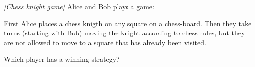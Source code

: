 

%




\noindent 

\begin{problem}
\textit{[Chess knight game]}
Alice and Bob plays a game:

First Alice places a chess knigth on any square on a chess-board. Then they take turns (starting with Bob) moving the knight according to chess rules, but they are not allowed to move to a square that has already been visited.

Which player has a winning strategy?

\end{problem}
%




